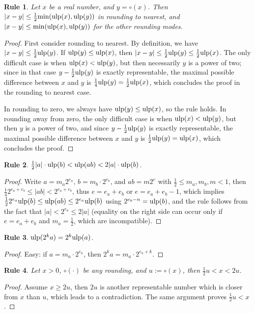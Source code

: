 \documentclass[12pt]{amsart}
\def\ulp{{\rm ulp}}
\newtheorem{Rule}{Rule}
\begin{document}
\begin{Rule} \label{R3}
Let $x$ be a real number, and $y = \circ(x)$.
Then $|x - y| \leq \frac{1}{2} {\rm min}(\ulp(x), \ulp(y))$
in rounding to nearest,
and $|x - y| \leq {\rm min}(\ulp(x), \ulp(y))$ for the other rounding modes.
\end{Rule}
\begin{proof}
First consider rounding to nearest.
By definition, we have $|x-y| \leq \frac{1}{2} \ulp(y)$.
If $\ulp(y) \leq \ulp(x)$, then $|x-y| \leq \frac{1}{2} \ulp(y)
\leq \frac{1}{2} \ulp(x)$.
The only difficult case is when $\ulp(x) < \ulp(y)$, but then
necessarily $y$ is a power of two;
since in that case $y - \frac{1}{2} \ulp(y)$ is exactly representable,
the maximal possible difference between $x$ and $y$
is $\frac{1}{4} \ulp(y) = \frac{1}{2} \ulp(x)$, which concludes the proof
in the rounding to nearest case.

In rounding to zero, we always have $\ulp(y) \leq \ulp(x)$, so the rule
holds.
In rounding away from zero, the only difficult case is when
$\ulp(x) < \ulp(y)$, but then $y$ is a power of two, and since
$y - \frac{1}{2} \ulp(y)$ is exactly representable,
the maximal possible difference between $x$ and $y$ is $\frac{1}{2} \ulp(y)
= \ulp(x)$, which concludes the proof.
\end{proof}

\begin{Rule} \label{R4}
$\frac{1}{2} |a| \cdot \ulp(b) < \ulp(a b) < 2 |a| \cdot \ulp(b)$.
\end{Rule}
\begin{proof}
Write $a = m_a 2^{e_a}$, $b = m_b \cdot 2^{e_b}$, and $a b = m 2^e$
with $\frac{1}{2} \le m_a, m_b, m < 1$,
then $\frac{1}{4} 2^{e_a+e_b} \le |a b| < 2^{e_a+e_b}$,
thus $e = e_a + e_b$ or $e = e_a + e_b - 1$, which implies
$\frac{1}{2} 2^{e_a} \ulp(b) \le \ulp(a b) \le 2^{e_a} \ulp(b)$
using $2^{e_b-n} = \ulp(b)$, and the rule follows from
the fact that $|a| < 2^{e_a} \le 2|a|$ (equality on the right side can
occur only if $e = e_a + e_b$ and $m_a = \frac{1}{2}$, which are
incompatible).
\end{proof}

\begin{Rule} \label{R5}
$\ulp(2^k a) = 2^k \ulp(a)$.
\end{Rule}
\begin{proof}
Easy: if $a = m_a \cdot 2^{e_a}$, then $2^k a = m_a \cdot 2^{e_a+k}$.
\end{proof}

\begin{Rule} \label{R6}
Let $x > 0$, $\circ(\cdot)$ be any rounding, and $u := \circ(x)$,
then $\frac{1}{2} u < x < 2 u$.
\end{Rule}
\begin{proof}
Assume $x \geq 2 u$, then $2u$ is another representable number which is closer
from $x$ than $u$, which leads to a contradiction. The same argument proves
$\frac{1}{2} u < x$.
\end{proof}
\end{document}
